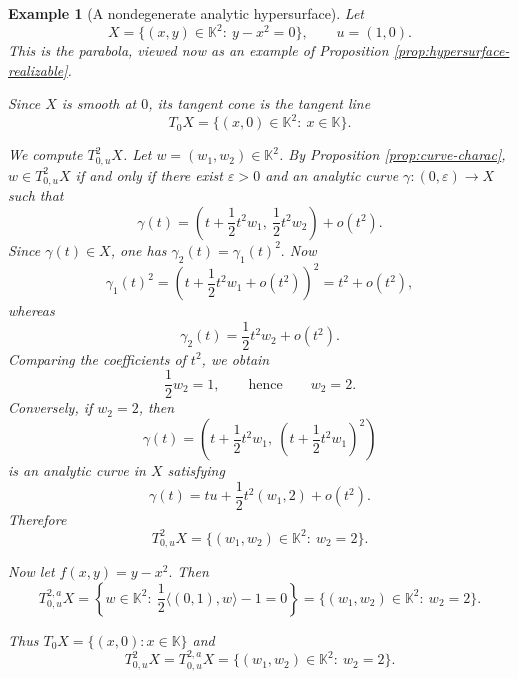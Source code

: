 \documentclass[10pt,reqno]{amsart}
\theoremstyle{break-italic}
\theoremstyle{break-italic}
\theoremstyle{break-italic}
\theoremstyle{break-italic}
\theoremstyle{break-italic}
\theoremstyle{break-italic}
\theoremstyle{break-italic}
\theoremstyle{break-italic}
\theoremstyle{break-roman}
\newtheorem{example}[satz]{Example}
\theoremstyle{standard}
\theoremstyle{varthm-roman}
\theoremstyle{varthm-italic}
\theoremstyle{varthm-roman-break}
\theoremstyle{varthm-italic-break}
\theoremstyle{varthm-roman-no-punctuation}
\theoremstyle{varthm-italic-no-punctuation}
\numberwithin{equation}{section}
\begin{document}
\begin{example}[A nondegenerate analytic hypersurface]\label{ex:hypersurface}
Let
\[
X=\{(x,y)\in \mathbb K^2:\ y-x^2=0\},
\qquad
u=(1,0).
\]
This is the parabola, viewed now as an example of
Proposition \ref{prop:hypersurface-realizable}.

Since $X$ is smooth at $0$, its tangent cone is the tangent line
\[
T_0X=\{(x,0)\in \mathbb K^2:\ x\in\mathbb K\}.
\]

We compute $T^2_{0,u}X$. Let $w=(w_1,w_2)\in \mathbb K^2$. By
Proposition \ref{prop:curve-charac}, $w\in T^2_{0,u}X$ if and only if there
exist $\varepsilon>0$ and an analytic curve
\(
\gamma:(0,\varepsilon)\to X
\)
such that
\[
\gamma(t)=\left(t+\frac12 t^2w_1,\ \frac12 t^2w_2\right)+o(t^2).
\]
Since $\gamma(t)\in X$, one has
\(
\gamma_2(t)=\gamma_1(t)^2.
\)
Now
\[
\gamma_1(t)^2
=
\left(t+\frac12 t^2w_1+o(t^2)\right)^2
=
t^2+o(t^2),
\]
whereas
\[
\gamma_2(t)=\frac12 t^2w_2+o(t^2).
\]
Comparing the coefficients of $t^2$, we obtain
\[
\frac12 w_2=1,
\qquad\text{hence}\qquad
w_2=2.
\]
Conversely, if $w_2=2$, then
\[
\gamma(t)=\left(t+\frac12 t^2w_1,\ \left(t+\frac12 t^2w_1\right)^2\right)
\]
is an analytic curve in $X$ satisfying
\[
\gamma(t)=tu+\frac12 t^2(w_1,2)+o(t^2).
\]
Therefore
\[
T^2_{0,u}X=\{(w_1,w_2)\in \mathbb K^2:\ w_2=2\}.
\]

Now let
\(
f(x,y)=y-x^2.
\)
Then
\[
T^{2,a}_{0,u}X
=
\left\{
w\in \mathbb K^2:\ \frac12\langle (0,1),w\rangle -1=0
\right\}
=
\{(w_1,w_2)\in \mathbb K^2:\ w_2=2\}.
\]

Thus
$T_0X=\{(x,0):x\in\mathbb K\}$ and 
\[
T^2_{0,u}X=T^{2,a}_{0,u}X=\{(w_1,w_2)\in\mathbb K^2:\ w_2=2\}.
\]
\end{example}
\end{document}
